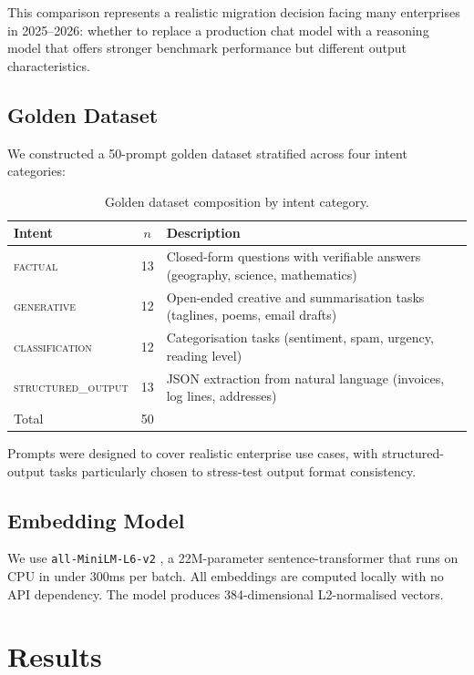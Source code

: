 \documentclass[11pt,a4paper]{article}
\begin{document}
This comparison represents a realistic migration decision facing many enterprises in
2025--2026: whether to replace a production chat model with a reasoning model that
offers stronger benchmark performance but different output characteristics.

\subsection{Golden Dataset}

We constructed a 50-prompt golden dataset stratified across four intent categories:

\begin{table}[h]
\centering
\small
\begin{tabular}{lcp{7cm}}
\toprule
Intent & $n$ & Description \\
\midrule
\textsc{factual}           & 13 & Closed-form questions with verifiable answers (geography, science, mathematics) \\
\textsc{generative}        & 12 & Open-ended creative and summarisation tasks (taglines, poems, email drafts) \\
\textsc{classification}    & 12 & Categorisation tasks (sentiment, spam, urgency, reading level) \\
\textsc{structured\_output}& 13 & JSON extraction from natural language (invoices, log lines, addresses) \\
\midrule
Total & 50 & \\
\bottomrule
\end{tabular}
\caption{Golden dataset composition by intent category.}
\label{tab:dataset}
\end{table}

Prompts were designed to cover realistic enterprise use cases, with
structured-output tasks particularly chosen to stress-test output format consistency.

\subsection{Embedding Model}

We use \texttt{all-MiniLM-L6-v2} \citep{wang2024minilm}, a 22M-parameter
sentence-transformer that runs on CPU in under 300ms per batch.
All embeddings are computed locally with no API dependency.
The model produces 384-dimensional L2-normalised vectors.

\section{Results}
\end{document}
